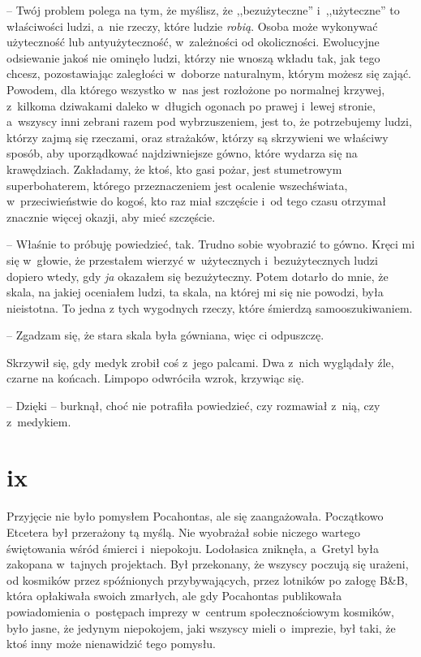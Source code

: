 \documentclass[oneside,polish,11pt,sfheadings]{mwbk}
\begin{document}
-- Twój problem polega na tym, że myślisz, że ,,bezużyteczne'' i~,,użyteczne'' to właściwości ludzi, a~nie rzeczy, które ludzie
\textit{robią}. Osoba może wykonywać użyteczność lub antyużyteczność, w~zależności od okoliczności. Ewolucyjne odsiewanie jakoś nie ominęło
ludzi, którzy nie wnoszą wkładu tak, jak tego chcesz, pozostawiając
zaległości w~doborze naturalnym, którym możesz się zająć. Powodem, dla
którego wszystko w~nas jest rozłożone po normalnej krzywej, z~kilkoma
dziwakami daleko w~długich ogonach po prawej i~lewej stronie, a~wszyscy
inni zebrani razem pod wybrzuszeniem, jest to, że potrzebujemy ludzi,
którzy zajmą się rzeczami, oraz strażaków, którzy są skrzywieni we
właściwy sposób, aby uporządkować najdziwniejsze gówno, które wydarza
się na krawędziach. Zakładamy, że ktoś, kto gasi pożar, jest stumetrowym
superbohaterem, którego przeznaczeniem jest ocalenie wszechświata, w~przeciwieństwie do kogoś, kto raz miał szczęście i~od tego czasu
otrzymał znacznie więcej okazji, aby mieć szczęście.

-- Właśnie to próbuję powiedzieć, tak. Trudno sobie wyobrazić to gówno.
Kręci mi się w~głowie, że przestałem wierzyć w~użytecznych i~bezużytecznych ludzi dopiero wtedy, gdy \textit{ja} okazałem się
bezużyteczny. Potem dotarło do mnie, że skala, na jakiej oceniałem
ludzi, ta skala, na której mi się nie powodzi, była nieistotna. To jedna
z tych wygodnych rzeczy, które śmierdzą samooszukiwaniem.

-- Zgadzam się, że stara skala była gówniana, więc ci odpuszczę.

Skrzywił się, gdy medyk zrobił coś z~jego palcami. Dwa z~nich wyglądały
źle, czarne na końcach. Limpopo odwróciła wzrok, krzywiąc się.

-- Dzięki -- burknął, choć nie potrafiła powiedzieć, czy rozmawiał z~nią,
czy z~medykiem.

\chapter*{ix}

Przyjęcie nie było pomysłem Pocahontas, ale się zaangażowała. Początkowo
Etcetera był przerażony tą myślą. Nie wyobrażał sobie niczego wartego
świętowania wśród śmierci i~niepokoju. Lodołasica zniknęła, a~Gretyl
była zakopana w~tajnych projektach. Był przekonany, że wszyscy poczują
się urażeni, od kosmików przez spóźnionych przybywających, przez
lotników po załogę B\&B, która opłakiwała swoich zmarłych, ale gdy
Pocahontas publikowała powiadomienia o~postępach imprezy w~centrum
społecznościowym kosmików, było jasne, że jedynym niepokojem, jaki
wszyscy mieli o~imprezie, był taki, że ktoś inny może nienawidzić tego
pomysłu.
\end{document}
